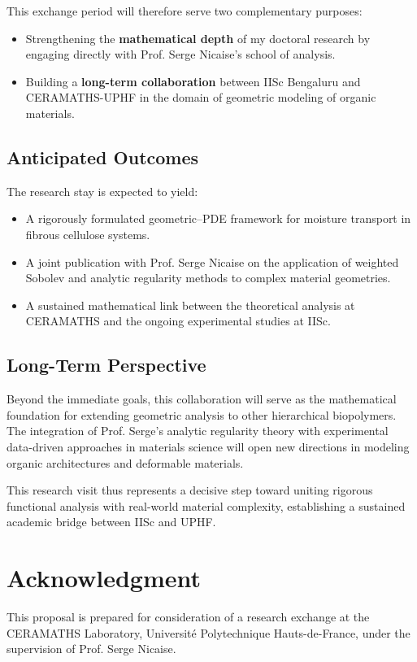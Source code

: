 \documentclass[11pt]{article}
\begin{document}
This exchange period will therefore serve two complementary purposes:
\begin{itemize}
    \item Strengthening the \textbf{mathematical depth} of my doctoral research by engaging directly with Prof. Serge Nicaise’s school of analysis.
    \item Building a \textbf{long-term collaboration} between IISc Bengaluru and CERAMATHS-UPHF in the domain of geometric modeling of organic materials.
\end{itemize}

\subsection*{Anticipated Outcomes}
The research stay is expected to yield:
\begin{itemize}
    \item A rigorously formulated geometric–PDE framework for moisture transport in fibrous cellulose systems.
    \item A joint publication with Prof. Serge Nicaise on the application of weighted Sobolev and analytic regularity methods to complex material geometries.
    \item A sustained mathematical link between the theoretical analysis at CERAMATHS and the ongoing experimental studies at IISc.
\end{itemize}

\subsection*{Long-Term Perspective}
Beyond the immediate goals, this collaboration will serve as the mathematical foundation for extending geometric analysis to other hierarchical biopolymers. The integration of Prof. Serge’s analytic regularity theory with experimental data-driven approaches in materials science will open new directions in modeling organic architectures and deformable materials.

This research visit thus represents a decisive step toward uniting rigorous functional analysis with real-world material complexity, establishing a sustained academic bridge between IISc and UPHF.


\section*{Acknowledgment}
This proposal is prepared for consideration of a research exchange at the CERAMATHS Laboratory, Université Polytechnique Hauts-de-France, under the supervision of Prof. Serge Nicaise.

\newpage  %


\end{document}
